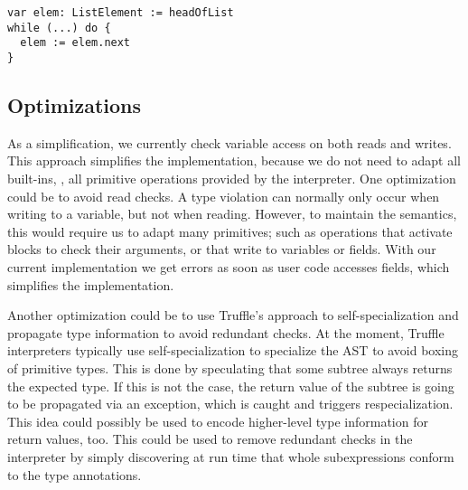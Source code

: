 \begin{lstlisting}[caption={Example for dynamic type checks not corresponding to existing checks.},escapechar=|,label={ex:pathological-case},float,floatplacement=htb]
var elem: ListElement := headOfList
while (...) do {
  elem := elem.next
}
\end{lstlisting}

\subsection{Optimizations}


As a simplification, we currently check variable access
on both reads and writes.
This approach simplifies the implementation, because we do not need to
adapt all built-ins, \ie,
all primitive operations provided by the interpreter.
One optimization could be to avoid read checks.
A type violation can normally only occur when writing to a variable,
but not when reading.
However, to maintain the semantics, this would require us to adapt
many primitives; 
such as operations that activate blocks to check their arguments,
or that write to variables or fields.
With our current implementation
we get errors as soon as user code accesses fields,
which simplifies the implementation.


Another optimization could be to use Truffle's approach to 
self-specialization\citep{Wurthinger:2012:SelfOptAST}
and propagate type information to avoid redundant checks.
At the moment, Truffle interpreters typically use self-specialization to 
specialize the AST to avoid boxing of primitive types.
This is done by speculating that some subtree always returns the expected type.
If this is not the case, the return value of the subtree is going to be
propagated via an exception, which is caught and triggers respecialization.
This idea could possibly be used to encode higher-level type information for
return values, too.
This could be used to remove redundant checks in the interpreter
by simply discovering at run time that whole subexpressions conform to the
type annotations.


